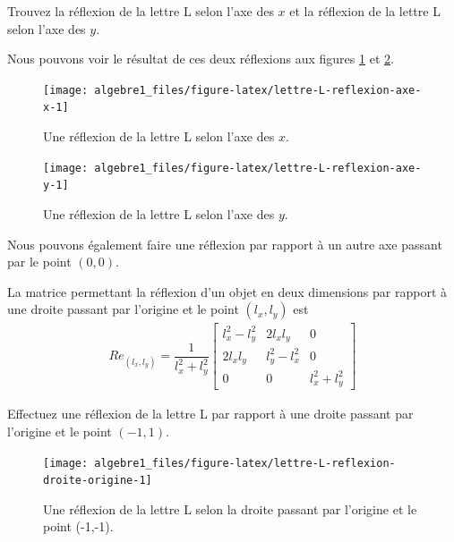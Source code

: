 \documentclass[]{book}
\theoremstyle{definition}
\theoremstyle{definition}
\theoremstyle{definition}
\theoremstyle{remark}
\let\BeginKnitrBlock\begin \let\EndKnitrBlock\end
\begin{document}
\BeginKnitrBlock{example}
\protect\hypertarget{exm:unnamed-chunk-254}{}{\label{exm:unnamed-chunk-254} }Trouvez la réflexion de la lettre L selon l'axe des \(x\) et la réflexion de la lettre L selon l'axe des \(y\).
\EndKnitrBlock{example}

Nous pouvons voir le résultat de ces deux réflexions aux figures \ref{fig:lettre-L-reflexion-axe-x} et \ref{fig:lettre-L-reflexion-axe-y}.

\begin{figure}

{\centering \texttt{[image: algebre1\_files/figure-latex/lettre-L-reflexion-axe-x-1]} 

}

\caption{Une réflexion de la lettre L selon l'axe des $x$.}\label{fig:lettre-L-reflexion-axe-x}
\end{figure}

\begin{figure}

{\centering \texttt{[image: algebre1\_files/figure-latex/lettre-L-reflexion-axe-y-1]} 

}

\caption{Une réflexion de la lettre L selon l'axe des $y$.}\label{fig:lettre-L-reflexion-axe-y}
\end{figure}

Nous pouvons également faire une réflexion par rapport à un autre axe passant par le point \((0,0)\).

\BeginKnitrBlock{definition}
\protect\hypertarget{def:unnamed-chunk-255}{}{\label{def:unnamed-chunk-255} }La matrice permettant la réflexion d'un objet en deux dimensions par rapport à une droite passant par l'origine et le point \((l_x,l_y)\) est
\begin{align*}
    Re_{(l_x,l_y)}=\dfrac{1}{l_x^2+l_y^2}
    \begin{bmatrix}
        l_x^2-l_y^2 & 2l_xl_y &0\\
        2l_xl_y & l_y^2-l_x^2 &0\\
        0&0&l_x^2+l_y^2
    \end{bmatrix}
\end{align*}
\EndKnitrBlock{definition}

\BeginKnitrBlock{example}
\protect\hypertarget{exm:unnamed-chunk-256}{}{\label{exm:unnamed-chunk-256} }Effectuez une réflexion de la lettre L par rapport à une droite passant par l'origine et le point \((-1,1)\).
\EndKnitrBlock{example}

\begin{figure}

{\centering \texttt{[image: algebre1\_files/figure-latex/lettre-L-reflexion-droite-origine-1]} 

}

\caption{Une réflexion de la lettre L selon la droite passant par l'origine et le point (-1,-1).}\label{fig:lettre-L-reflexion-droite-origine}
\end{figure}
\end{document}
